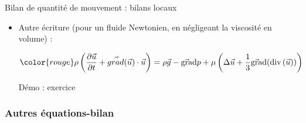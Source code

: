 \begin{frame}{Bilan de quantité de mouvement : bilans locaux}
\begin{itemize}
$(ii)$ Par un bilan des forces appliqué à un volume élémentaire $dV$.

\medskip
\pause

\item Autre écriture (pour un fluide Newtonien, en négligeant la viscosité en volume) :


	\begin{equation}
	\color{rouge}
		\rho \left( \dpdt{\myvec{u}} + \mytensor{grad} (\myvec{u}) \cdot \myvec{u}  \right)
		= 
		\rho \myvec{g}  - \gradient p + \mu \left( \Delta \myvec{u} + \frac{1}{3} \gradient (\divergence( \myvec{u})) \right)
	\end{equation}


Démo : exercice

\end{itemize}


\vspace{15mm}

\end{frame}

\subsubsection{Autres équations-bilan}




